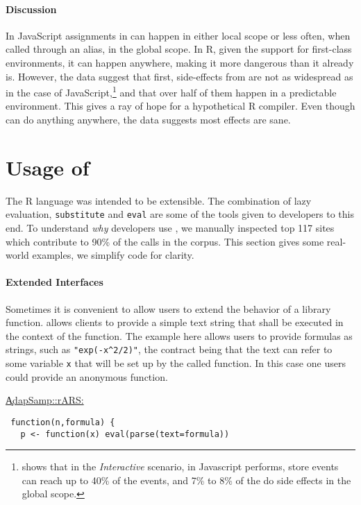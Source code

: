 \documentclass[screen,acmsmall]{acmart}%
\renewcommand{\k}[1]{\lstinline |#1|\xspace}
\begin{document}
\paragraph{Discussion} In JavaScript assignments in \eval can happen in either
local scope or less often, when called through an alias, in the global scope.
In R, given the support for first-class environments, it can happen anywhere,
making it \eval more dangerous than it already is. However, the data suggest
that first, side-effects from \eval are not as widespread as in the case of
JavaScript,\footnote{\citep{ecoop11} shows that in the \emph{Interactive}
  scenario, \eval in Javascript performs, store events can reach up to 40\% of
the events, and 7\% to 8\% of the \eval do side effects in the global scope. }
and that over half of them happen in a predictable environment. This gives a
ray of hope for a hypothetical R compiler. Even though \eval can do anything
anywhere, the data suggests most effects are sane.

\section{Usage of \eval}

The R language was intended to be extensible. The combination of lazy
evaluation, \k{substitute} and \k{eval} are some of the tools given to
developers to this end. To understand \emph{why} developers use \eval, we
manually inspected top 117 sites which contribute to 90\% of the calls in the
corpus. This section gives some real-world examples, we simplify code for
clarity.

\paragraph{Extended Interfaces}
Sometimes it is convenient to allow users to extend the behavior of a library
function. \Eval allows clients to provide a simple text string that shall be
executed in the context of the function. The example here allows users to
provide formulas as strings, such as \k{"exp(-x^2/2)"}, the contract being that
the text can refer to some variable \k{x} that will be set up by the called
function. In this case one users could provide an anonymous function.

\begin{minipage}{.95\textwidth}
\medskip\underline{\c{AdapSamp::rARS}:}
\begin{lstlisting}
 function(n,formula) {
   p <- function(x) eval(parse(text=formula))
\end{lstlisting}\medskip
\end{minipage}
\end{document}
